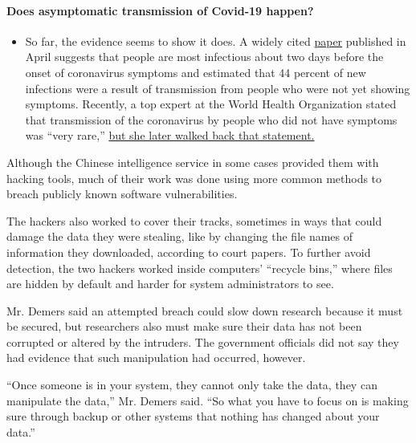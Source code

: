 \begin{itemize}
{  \paragraph{Does asymptomatic transmission of Covid-19
  happen?}\label{does-asymptomatic-transmission-of-covid-19-happen}}

  \begin{itemize}
  \tightlist
  \item
    So far, the evidence seems to show it does. A widely cited
    \href{https://www.nature.com/articles/s41591-020-0869-5}{paper}
    published in April suggests that people are most infectious about
    two days before the onset of coronavirus symptoms and estimated that
    44 percent of new infections were a result of transmission from
    people who were not yet showing symptoms. Recently, a top expert at
    the World Health Organization stated that transmission of the
    coronavirus by people who did not have symptoms was ``very rare,''
    \href{https://www.nytimes.com/2020/06/09/world/coronavirus-updates.html?action=click\&pgtype=Article\&state=default\&region=MAIN_CONTENT_3\&context=storylines_faq\#link-1f302e21}{but
    she later walked back that statement.}
  \end{itemize}
\end{itemize}

Although the Chinese intelligence service in some cases provided them
with hacking tools, much of their work was done using more common
methods to breach publicly known software vulnerabilities.

The hackers also worked to cover their tracks, sometimes in ways that
could damage the data they were stealing, like by changing the file
names of information they downloaded, according to court papers. To
further avoid detection, the two hackers worked inside computers'
``recycle bins,'' where files are hidden by default and harder for
system administrators to see.

Mr. Demers said an attempted breach could slow down research because it
must be secured, but researchers also must make sure their data has not
been corrupted or altered by the intruders. The government officials did
not say they had evidence that such manipulation had occurred, however.

``Once someone is in your system, they cannot only take the data, they
can manipulate the data,'' Mr. Demers said. ``So what you have to focus
on is making sure through backup or other systems that nothing has
changed about your data.''

